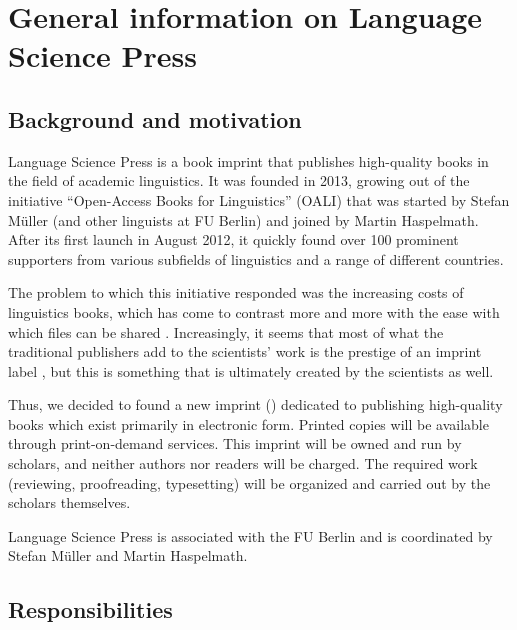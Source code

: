 \chapter{General information on Language Science Press}


\section{Background and motivation}

Language Science Press is a book imprint that publishes high-quality books in the field of academic linguistics. It was founded in 2013, growing out of the initiative ``Open-Access Books for Linguistics'' (OALI) that was started by Stefan Müller (and other linguists at FU Berlin) and joined by Martin Haspelmath. After its first launch in August 2012, it quickly found over 100 prominent supporters from various subfields of linguistics and a range of different countries.

The problem to which this initiative responded was the increasing costs of linguistics books, which has come to contrast more and more with the ease with which files can be shared \citep{MuellerOA}. Increasingly, it seems that most of what the traditional publishers add to the scientists' work is the prestige of an imprint label \citep{Haspelmath2012a}, but this is something that is ultimately created by the scientists as well.

Thus, we decided to found a new imprint (\lsp) dedicated to publishing high-quality books which exist primarily in electronic form. Printed copies will be available through print-on-demand services. This imprint will be owned and run by scholars, and neither authors nor readers will be charged. The required work (reviewing, proofreading, typesetting) will be organized and carried out by the scholars themselves.

Language Science Press is associated with the FU Berlin and is coordinated by Stefan Müller and Martin Haspelmath.




\section{Responsibilities}

